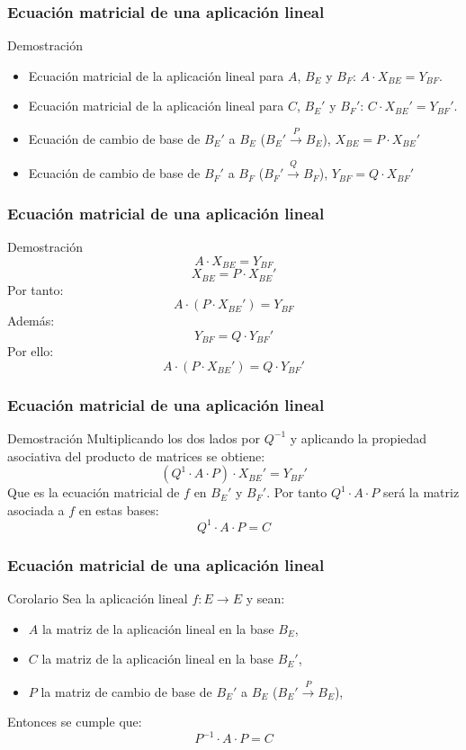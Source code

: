 \documentclass{beamer}
\begin{document}
 
      \begin{frame}
  \frametitle{Ecuaci\'on matricial de una aplicaci\'on lineal}
\begin{block}{Demostraci\'on}
\begin{itemize}
\item Ecuaci\'on matricial de la aplicaci\'on lineal para $A$, $B_E$ y $B_F$: $A \cdot X_{BE} = Y_{BF}$.
\item Ecuaci\'on matricial de la aplicaci\'on lineal para $C$, $B_E'$ y $B_F'$: $C \cdot X_{BE}' = Y_{BF}'$.
\item Ecuaci\'on de cambio de base de $B_E'$ a $B_E$ ($B_E'\xrightarrow{P}B_E$), $X_{BE} = P \cdot X_{BE}'$
\item Ecuaci\'on de cambio de base de $B_F'$ a $B_F$ ($B_F'\xrightarrow{Q}B_F$), $Y_{BF} = Q \cdot X_{BF}'$
\end{itemize}
\end{block}
 \end{frame}    
 
       \begin{frame}
  \frametitle{Ecuaci\'on matricial de una aplicaci\'on lineal}
\begin{block}{Demostraci\'on}
\[A \cdot X_{BE} = Y_{BF}\]
\[X_{BE} = P \cdot X_{BE}'\]
Por tanto: 
\[A \cdot ( P \cdot X_{BE}') = Y_{BF}\]
Adem\'as: 
\[Y_{BF} = Q \cdot Y_{BF}'\]
Por ello:
\[A \cdot (P\cdot X_{BE}') = Q\cdot Y_{BF}'\]
\end{block}
 \end{frame}    


        \begin{frame}
  \frametitle{Ecuaci\'on matricial de una aplicaci\'on lineal}
\begin{block}{Demostraci\'on}
Multiplicando los dos lados por $Q^{-1}$ y aplicando la propiedad asociativa del producto de matrices se obtiene: 
\[ (Q^{1} \cdot A \cdot P )\cdot X_{BE}' =  Y_{BF}'\]
Que es la ecuaci\'on matricial de $f$ en $B_E'$ y $B_F'$. Por tanto $Q^{1} \cdot A \cdot P $ ser\'a la matriz asociada a $f$ en estas bases:
\[Q^{1} \cdot A \cdot P =C\]
\end{block}
 \end{frame}    
 
         \begin{frame}
  \frametitle{Ecuaci\'on matricial de una aplicaci\'on lineal}
\begin{block}{Corolario}
Sea la aplicaci\'on lineal $f:E\longrightarrow E$ y sean:
\begin{itemize}
\item $A$ la matriz de la aplicaci\'on lineal en la base $B_E$, 
\item $C$ la matriz de la aplicaci\'on lineal en la base $B_E'$, 
\item $P$ la matriz de cambio de base de $B_E'$ a $B_E$ ($B_E'\xrightarrow{P}B_E$),
\end{itemize}
Entonces se cumple que: 
\[P^{-1}\cdot A \cdot P = C\]
\end{block}
 \end{frame}    
 
\end{document}
